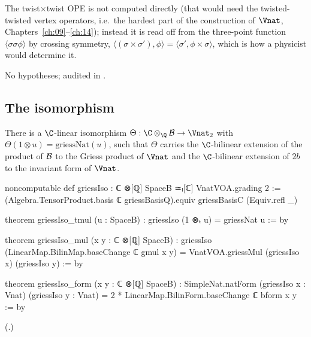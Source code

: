 \begin{physics}
The twist$\times$twist OPE is not computed directly (that would need the twisted-twisted vertex
operators, i.e.\ the hardest part of the construction of $\Vnat$, Chapters~\ref{ch:09}--\ref{ch:14});
instead it is read off from the three-point function $\langle\sigma\sigma\phi\rangle$ by crossing
symmetry, $\langle(\sigma\times\sigma'),\phi\rangle=\langle\sigma',\phi\times\sigma\rangle$, which is
how a physicist would determine it.
\end{physics}
\begin{status}
No hypotheses; audited in .
\end{status}

\subsection{The isomorphism}

\begin{theorem}\label{ch21:thm:griessIso}
There is a $\C$-linear isomorphism $\Theta:\C\otimes_\Q\chXXIB\to\Vnat_2$ with
$\Theta(1\otimes u)=\mathrm{griessNat}(u)$, such that $\Theta$ carries the $\C$-bilinear extension of the
product of $\mathcal{B}$ to the Griess product of $\Vnat$ and the $\C$-bilinear extension of $2b$ to the
invariant form of $\Vnat$.
\end{theorem}
\begin{leancode}
noncomputable def griessIso : ℂ ⊗[ℚ] SpaceB ≃ₗ[ℂ] VnatVOA.grading 2 :=
  (Algebra.TensorProduct.basis ℂ griessBasisQ).equiv griessBasisC (Equiv.refl _)
\end{leancode}
\begin{leancode}
theorem griessIso_tmul (u : SpaceB) : griessIso (1 ⊗ₜ u) = griessNat u := by
\end{leancode}
\begin{leancode}
theorem griessIso_mul (x y : ℂ ⊗[ℚ] SpaceB) :
    griessIso (LinearMap.BilinMap.baseChange ℂ gmul x y)
      = VnatVOA.griessMul (griessIso x) (griessIso y) := by
\end{leancode}
\begin{leancode}
theorem griessIso_form (x y : ℂ ⊗[ℚ] SpaceB) :
    SimpleNat.natForm (griessIso x : Vnat) (griessIso y : Vnat)
      = 2 * LinearMap.BilinForm.baseChange ℂ bform x y := by
\end{leancode}
(.)

